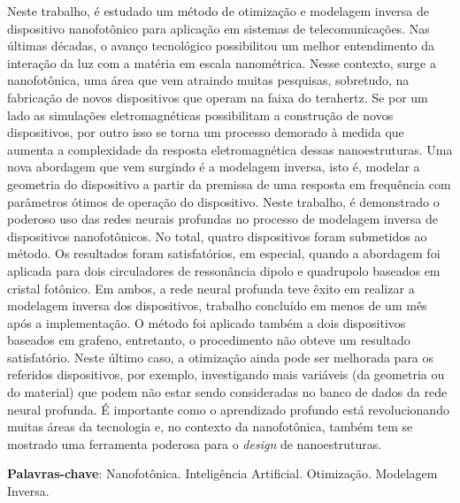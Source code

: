 

\begin{resumo}[Resumo]

Neste trabalho, é estudado um método de otimização e modelagem inversa de dispositivo nanofotônico para aplicação em sistemas de telecomunicações. Nas últimas décadas, o avanço tecnológico possibilitou um melhor entendimento da interação da luz com a matéria em escala nanométrica. Nesse contexto, surge a nanofotônica, uma área que vem atraindo muitas pesquisas, sobretudo, na fabricação de novos dispositivos que operam na faixa do terahertz. Se por um lado as simulações eletromagnéticas possibilitam a construção de novos dispositivos, por outro isso se torna um processo demorado à medida que aumenta a complexidade da resposta eletromagnética dessas nanoestruturas. Uma nova abordagem que vem surgindo é a modelagem inversa, isto é, modelar a geometria do dispositivo a partir da premissa de uma resposta em frequência com parâmetros ótimos de operação do dispositivo. Neste trabalho, é demonstrado o poderoso uso das redes neurais profundas no processo de modelagem inversa de dispositivos nanofotônicos. No total, quatro dispositivos foram submetidos ao método. Os resultados foram satisfatórios, em especial, quando a abordagem foi aplicada para dois circuladores de ressonância dipolo e quadrupolo baseados em cristal fotônico. Em ambos, a rede neural profunda teve êxito em realizar a modelagem inversa dos dispositivos, trabalho concluído em menos de um mês após a implementação. O método foi aplicado também a dois dispositivos baseados em grafeno, entretanto, o procedimento não obteve um resultado satisfatório. Neste último caso, a otimização ainda pode ser melhorada para os referidos dispositivos, por exemplo, investigando mais variáveis (da geometria ou do material) que podem não estar sendo consideradas no banco de dados da rede neural profunda. É importante como o aprendizado profundo está revolucionando muitas áreas da tecnologia e, no contexto da nanofotônica, também tem se mostrado uma ferramenta poderosa para o \textit{design} de nanoestruturas.


\vspace{\onelineskip}
\noindent
\textbf{Palavras-chave}: Nanofotônica. Inteligência Artificial. Otimização. Modelagem Inversa.
\end{resumo}